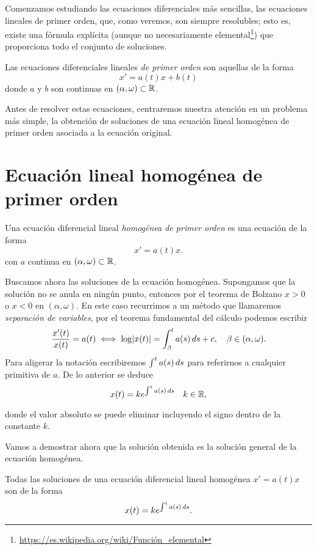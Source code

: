 \documentclass[../ecuaciones_diferenciales.tex]{subfiles}
\begin{document}
Comenzamos estudiando las ecuaciones diferenciales más sencillas, las ecuaciones
lineales de primer orden, que, como veremos, son siempre resolubles; esto es,
existe una fórmula explícita (aunque no necesariamente
elemental\footnote{\url{https://es.wikipedia.org/wiki/Función_elemental}}) que
proporciona todo el conjunto de soluciones.

\begin{definition}
    Las ecuaciones diferenciales lineales \emph{de primer orden} son aquellas de
    la forma
	\[x' = a(t)x + b(t)\]
	donde \(a\) y \(b\) son continuas en \((\alpha, \omega) \subset \mathbb{R}\).
\end{definition}

Antes de resolver estas ecuaciones, centraremos nuestra atención en un problema
más simple, la obtención de soluciones de una ecuación lineal homogénea de
primer orden asociada a la ecuación original.

\section{Ecuación lineal homogénea de primer orden} \label{sec:hom}

\begin{definition}
    Una ecuación diferencial lineal \emph{homogénea de primer orden} es una
    ecuación de la forma
	\[x' = a(t)x.\]
	con \(a\) continua en \((\alpha, \omega) \subset \mathbb{R}\).
\end{definition}

Buscamos ahora las soluciones de la ecuación homogénea. Supongamos que la
solución no se anula en ningún punto, entonces por el teorema de Bolzano
\(x > 0\) o \(x < 0\) en \((\alpha, \omega)\). En este caso recurrimos a un
método que llamaremos \emph{separación de variables}, por el teorema fundamental
del cálculo podemos escribir
\[\frac{x'(t)}{x(t)} = a(t) \iff \log\abs{x(t)}
	= \int_{\beta}^t a(s) \dif s + c,
	\quad \beta \in (\alpha, \omega).\]
Para aligerar la notación escribiremos \(\int^t a(s) \mathop{d\!} s\) para referirnos
a cualquier primitiva de \(a\). De lo anterior se deduce
\[x(t) = k e^{\int^t a(s) \mathop{d\!} s} \quad k \in \mathbb{R},\]

donde el valor absoluto se puede eliminar incluyendo el signo dentro de la
constante \(k\).

Vamos a demostrar ahora que la solución obtenida es la solución general de la
ecuación homogénea.

\begin{theorem}
	Todas las soluciones de una ecuación diferencial lineal homogénea
	\(x' = a(t)x\) son de la forma
	\begin{equation}
		x(t) = k e^{\int^t a(s) \mathop{d\!} s}. \label{eq:sol_gen}
	\end{equation}
\end{theorem}
\end{document}
